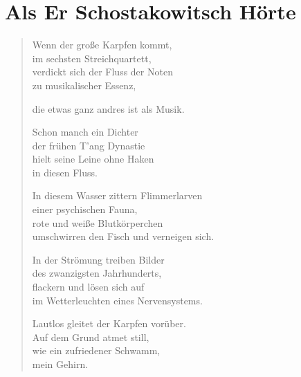 
\cleartoverso

{\setlength{\stanzaskip}{0.5em}

\section{Als Er Schostakowitsch Hörte}

\vspace*{-\onelineskip}
\begin{verse}

Wenn der große Karpfen kommt,\\
im sechsten Streichquartett,\\
verdickt sich der Fluss der Noten\\
zu musikalischer Essenz,

die etwas ganz andres ist als Musik.

Schon manch ein Dichter\\
der frühen T'ang Dynastie\\
hielt seine Leine ohne Haken\\
in diesen Fluss.

In diesem Wasser zittern Flimmerlarven\\
einer psychischen Fauna,\\
rote und weiße Blutkörperchen\\
umschwirren den Fisch und verneigen sich.

In der Strömung treiben Bilder\\
des zwanzigsten Jahrhunderts,\\
flackern und lösen sich auf\\
im Wetterleuchten eines Nervensystems.

Lautlos gleitet der Karpfen vorüber.\\
Auf dem Grund atmet still,\\
wie ein zufriedener Schwamm,\\
mein Gehirn.

\end{verse}

}

\clearpage


